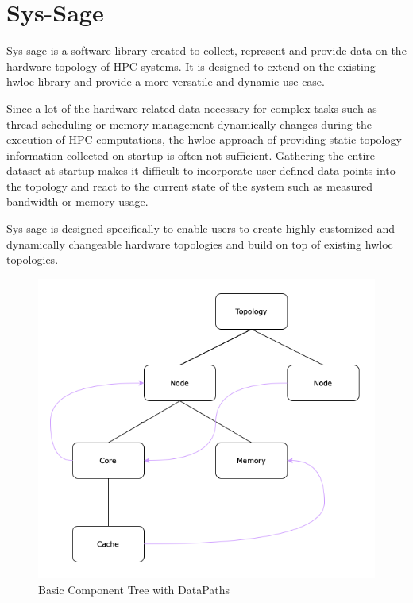 
\chapter{Sys-Sage}\label{chapter:sys_sage}
Sys-sage is a software library created to collect, represent and provide data on the hardware topology of HPC systems.
It is designed to extend on the existing hwloc library and provide a more versatile and dynamic use-case.

Since a lot of the hardware related data necessary for complex tasks such as thread scheduling or memory management dynamically changes during the execution of
HPC computations, the hwloc approach of providing static topology information collected on startup is often not sufficient.
Gathering the entire dataset at startup makes it difficult to incorporate user-defined data points into the topology and react to the current state of the system
such as measured bandwidth or memory usage.

Sys-sage is designed specifically to enable users to create highly customized and dynamically changeable hardware topologies and build on top of existing hwloc topologies.

\begin{figure}[ht]
    \includegraphics[scale=0.3]{images/Topology_Example.png} %
    \centering
    \caption{Basic Component Tree with DataPaths}
    \label{figure:topology_example}
\end{figure}


